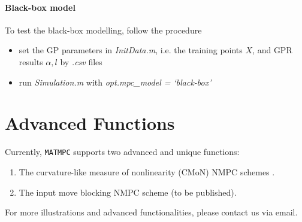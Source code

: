 \documentclass{article}
\newcommand{\software}[1]{{\tt#1}}
\begin{document}
\paragraph{Black-box model}
To test the black-box modelling, follow the procedure
\begin{itemize}
    \item set the GP parameters in \textit{InitData.m}, i.e. the training points $X$, and GPR results $\alpha, l$ by \textit{.csv} files
    \item run \textit{Simulation.m} with \textit{opt.mpc\_model = `black-box'}
\end{itemize}

\section{Advanced Functions}
Currently, \software{MATMPC} supports two advanced and unique functions:
\begin{enumerate}
	\item The curvature-like measure of nonlinearity (CMoN) NMPC schemes \cite{chen2017fast, chen2018adaptive}.
	\item The input move blocking NMPC scheme (to be published). 
\end{enumerate}

For more illustrations and advanced functionalities, please contact us via email.

\appendix
\end{document}
